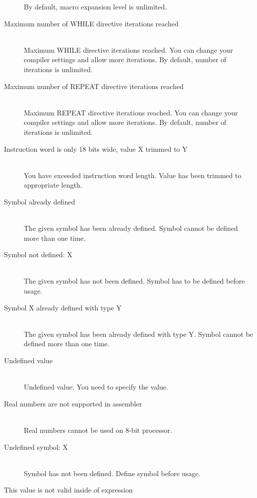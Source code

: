 \begin{description}
                    By default, macro expansion level is unlimited.
                    \item[Maximum number of WHILE directive iterations reached ] \hfill \\    
                    Maximum WHILE directive iterations reached. You can change your compiler settings and allow more iterations.
                    By default, number of iterations is unlimited.
                    \item[Maximum number of REPEAT directive iterations reached ] \hfill \\                     
                    Maximum REPEAT directive iterations reached. You can change your compiler settings and allow more iterations.
                    By default, number of iterations is unlimited.
                    \item[Instruction word is only 18 bits wide, value X trimmed to Y ] \hfill \\
                    You have exceeded instruction word length. Value has been trimmed to  appropriate length.
                    \item[Symbol already defined] \hfill \\
                    The given symbol has been already defined. Symbol cannot be defined more than one time.
                    \item[Symbol not defined: X ] \hfill \\
                    The given symbol has not been defined. Symbol has to be defined before usage.
                    \item[Symbol X already defined with type Y] \hfill \\
                    The given symbol has been already defined with type Y. Symbol cannot be defined more than one time.
                    \item[Undefined value ] \hfill \\
                    Undefined value. You need to specify the value.                       %
                    \item[Real numbers are not supported in assembler ] \hfill \\
                    Real numbers cannot be used on 8-bit processor.
                    \item[Undefined symbol: X ] \hfill \\
                    Symbol has not been defined. Define symbol before usage.
                    \item[This value is not valid inside of expression ] \hfill \\         %

\end{description}
